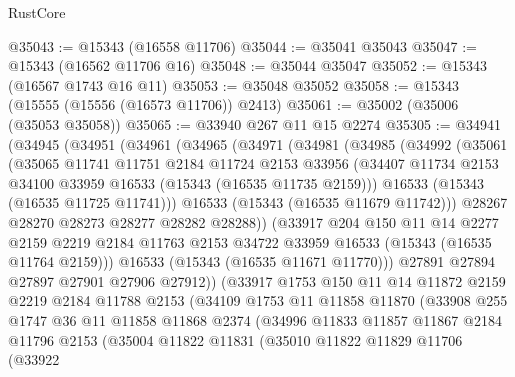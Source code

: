 \begin{lexlean}{RustCore}
\begin{coremodule}
@35043 := @15343 (@16558 @11706)
@35044 := @35041 @35043
@35047 := @15343 (@16562 @11706 @16)
@35048 := @35044 @35047
@35052 := @15343 (@16567 @1743 @16 @11)
@35053 := @35048 @35052
@35058 := @15343 (@15555 (@15556 (@16573 @11706)) @2413)
@35061 := @35002 (@35006 (@35053 @35058))
@35065 := @33940 @267 @11 @15 @2274
@35305 := @34941
    (@34945
      (@34951
        (@34961
          (@34965
            (@34971
              (@34981
                (@34985
                  (@34992
                    (@35061
                      (@35065
                        @11741
                        @11751
                        @2184
                        @11724
                        @2153
                        @33956
                        (@34407 @11734 @2153 @34100 @33959 @16533 (@15343 (@16535 @11735 @2159)))
                        @16533
                        (@15343 (@16535 @11725 @11741)))
                      @16533
                      (@15343 (@16535 @11679 @11742)))
                    @28267
                    @28270
                    @28273
                    @28277
                    @28282
                    @28288))
                (@33917
                  @204
                  @150
                  @11
                  @14
                  @2277
                  @2159
                  @2219
                  @2184
                  @11763
                  @2153
                  @34722
                  @33959
                  @16533
                  (@15343 (@16535 @11764 @2159)))
                @16533
                (@15343 (@16535 @11671 @11770)))
              @27891
              @27894
              @27897
              @27901
              @27906
              @27912))
          (@33917
            @1753
            @150
            @11
            @14
            @11872
            @2159
            @2219
            @2184
            @11788
            @2153
            (@34109
              @1753
              @11
              @11858
              @11870
              (@33908
                @255
                @1747
                @36
                @11
                @11858
                @11868
                @2374
                (@34996
                  @11833
                  @11857
                  @11867
                  @2184
                  @11796
                  @2153
                  (@35004
                    @11822
                    @11831
                    (@35010
                      @11822
                      @11829
                      @11706
                      (@33922

\end{coremodule}
\end{lexlean}
